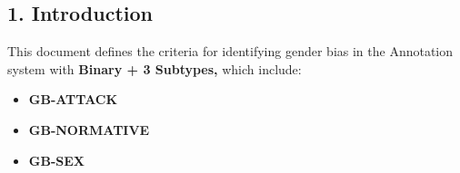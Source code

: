 \documentclass[12pt,oneside,openright,a4paper]{cpe-english-project}
\def\appendixnames{Appendix}
\begin{document}
\def\appendixnames{Appendices}
\setcounter{secnumdepth}{-1}
\setcounter{tocdepth}{0}
\let\mainfullSubsection\subsection
\let\mainfullSubsubsection\subsubsection
\let\mainfullParagraph\paragraph
\renewcommand{\subsection}[1]{\mainfullSubsection*{#1}}
\renewcommand{\subsubsection}[1]{\mainfullSubsubsection*{#1}}
\renewcommand{\paragraph}[1]{\mainfullParagraph*{#1}}

\par\medskip
\subsection{1. Introduction}\label{introduction}

This document defines the criteria for identifying gender bias in the
Annotation system with \textbf{Binary + 3 Subtypes,} which include:

\begin{itemize}
\setlength{\itemsep}{0.15\baselineskip}
\setlength{\parsep}{0pt}
\setlength{\parskip}{0pt}
\item
  \textbf{GB-ATTACK}
\item
  \textbf{GB-NORMATIVE}
\item
  \textbf{GB-SEX}
\end{itemize}
\end{document}
